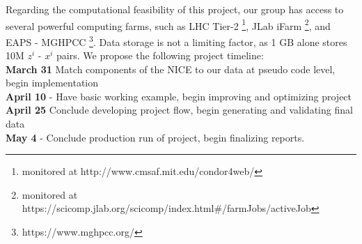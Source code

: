 Regarding the computational feasibility of this project, our group has access to several powerful computing farms, such as LHC Tier-2 \footnote{monitored at http://www.cmsaf.mit.edu/condor4web/}, JLab iFarm \footnote{monitored at https://scicomp.jlab.org/scicomp/index.html\#/farmJobs/activeJob}, and EAPS - MGHPCC \footnote{https://www.mghpcc.org/}. Data storage is not a limiting factor, as 1 GB alone stores 10M $z^i$ - $x^i$ pairs. We propose the following project timeline:\\
\textbf{March 31} Match components of the NICE to our data at pseudo code level, begin implementation \\
\textbf{April 10} - Have basic working example, begin improving and optimizing project \\ 
\textbf{April 25} Conclude developing project flow, begin generating and validating final data \\
\textbf{May 4} - Conclude production run of project, begin finalizing reports.


